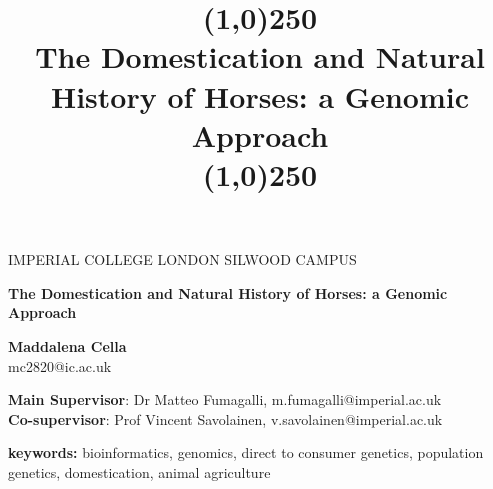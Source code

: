 \documentclass[a4paper,11]{article}
\begin{document}
	\begin{center}
		{\large IMPERIAL COLLEGE LONDON SILWOOD CAMPUS}
	\end{center}
	\vspace{3cm}
	
	\begin{center}
	\title{\line(1,0){250}\\ \Huge \textbf{The Domestication and Natural History of Horses: a Genomic Approach}\\ \line(1,0){250}}	
		\Huge \textbf{The Domestication and Natural History of Horses: a Genomic Approach}\\		
		\vspace{1cm}		
		
	\end{center}
	\vspace{2cm}
	\begin{center}
	
		\LARGE \textbf{Maddalena Cella}\\ \Large mc2820@ic.ac.uk\\
		\vspace{3cm}
		\end{center}
		\Large \textbf{Main Supervisor}: Dr Matteo Fumagalli, m.fumagalli@imperial.ac.uk\\
		\Large \textbf{Co-supervisor}: Prof Vincent Savolainen, v.savolainen@imperial.ac.uk \\

	
	\vspace{5cm}
	
		{\large \textbf{keywords:} bioinformatics, genomics, direct to consumer genetics, population genetics, domestication, animal agriculture }

	\newpage

\cleardoublepage{}
\end{document}
